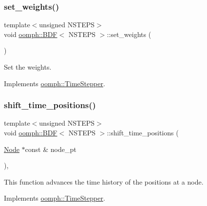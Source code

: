 \subsubsection{\texorpdfstring{set\+\_\+weights()}{set\_weights()}\hspace{0.1cm}{\footnotesize\ttfamily [4/4]}}
{\footnotesize\ttfamily template$<$unsigned N\+S\+T\+E\+PS$>$ \\
void \hyperlink{classoomph_1_1BDF}{oomph\+::\+B\+DF}$<$ N\+S\+T\+E\+PS $>$\+::set\+\_\+weights (\begin{DoxyParamCaption}{ }\end{DoxyParamCaption})\hspace{0.3cm}{\ttfamily [virtual]}}



Set the weights. 



Implements \hyperlink{classoomph_1_1TimeStepper_a028fa3a8d3c6db6b0ddf580cb0468d55}{oomph\+::\+Time\+Stepper}.

\mbox{\label{classoomph_1_1BDF_aad5191a5605337d43458d42f67460dbd}} 
\subsubsection{\texorpdfstring{shift\+\_\+time\+\_\+positions()}{shift\_time\_positions()}}
{\footnotesize\ttfamily template$<$unsigned N\+S\+T\+E\+PS$>$ \\
void \hyperlink{classoomph_1_1BDF}{oomph\+::\+B\+DF}$<$ N\+S\+T\+E\+PS $>$\+::shift\+\_\+time\+\_\+positions (\begin{DoxyParamCaption}\item[{\hyperlink{classoomph_1_1Node}{Node} $\ast$const \&}]{node\+\_\+pt }\end{DoxyParamCaption})\hspace{0.3cm}{\ttfamily [inline]}, {\ttfamily [virtual]}}



This function advances the time history of the positions at a node. 



Implements \hyperlink{classoomph_1_1TimeStepper_a518b1bee5dc3aae8c5ef13560d1954ac}{oomph\+::\+Time\+Stepper}.



